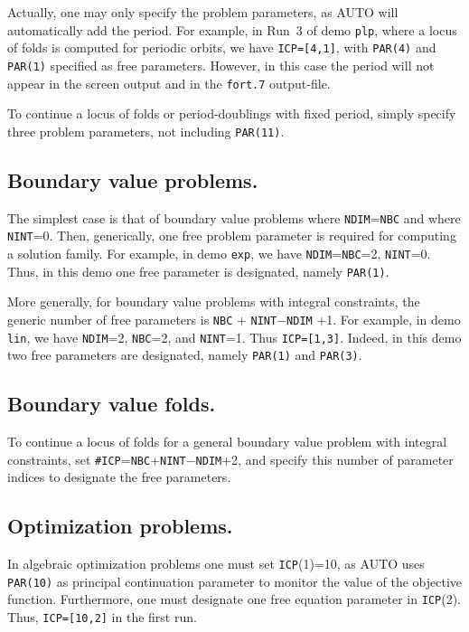 \documentclass[12pt]{report}
\begin{document}
Actually, one may only specify the problem parameters,
as {\cal AUTO} will automatically add the period.
For example, in Run~3 of demo {\tt plp}, where a locus of folds is computed 
for periodic orbits, we have {\tt ICP=[4,1]}, with {\tt PAR(4)} and {\tt PAR(1)} specified
as free parameters. 
However, in this case the period will not appear in the screen output 
and in the {\tt fort.7} output-file. 

To continue a locus of folds or period-doublings with fixed period, simply
specify three problem parameters, not including {\tt PAR(11)}.

\subsection{ Boundary value problems.}
The simplest case is that of boundary value problems where 
{\tt NDIM}={\tt NBC} 
and where {\tt NINT}=0.
Then, generically, one free problem parameter is required for computing 
a solution family.
For example, in demo {\tt exp}, we have {\tt NDIM}={\tt NBC}=2, {\tt NINT}=0. 
Thus, in this demo one free parameter is designated,
namely {\tt PAR(1)}.

More generally, for boundary value problems with integral constraints,
the generic number of free parameters is {\tt NBC} + {\tt NINT}$-${\tt NDIM} +1.
For example, in demo {\tt lin}, we have {\tt NDIM}=2, {\tt NBC}=2, and {\tt NINT}=1.
Thus {\tt ICP=[1,3]}. 
Indeed, in this demo two free parameters are designated,
namely {\tt PAR(1)} and {\tt PAR(3)}.

\subsection{ Boundary value folds.}
To continue a locus of folds for a general boundary value problem
with integral constraints, set {\tt \#ICP}={\tt NBC}+{\tt NINT}$-${\tt NDIM}+2, 
and specify this number of parameter indices to designate the free parameters.

\subsection{ Optimization problems.}
In algebraic optimization problems one must set {\tt ICP}(1)=10, 
as {\cal AUTO} uses {\tt PAR(10)} as principal continuation parameter
to monitor the value of the objective function.
Furthermore, one must designate one free equation parameter in {\tt ICP}(2). 
Thus, {\tt ICP=[10,2]} in the first run.
\end{document}
